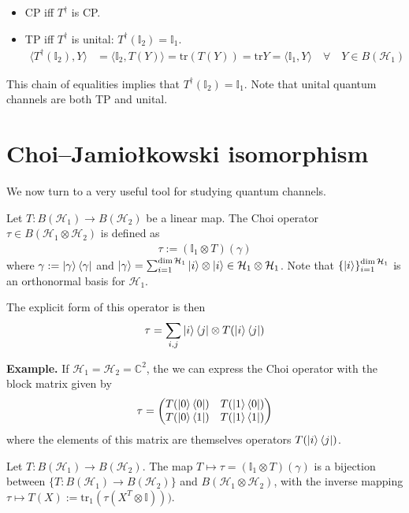 \documentclass[../../note.tex]{subfiles}
\begin{document}
\begin{itemize}
    \item CP iff $T^{\dagger}$ is CP.
    \item TP iff $T^{\dagger}$ is unital: $T^{\dagger}(\mathbb{I}_2)=\mathbb{I}_1$.
    \begin{align}
        \langle T^{\dagger}(\mathbb{I}_2),Y \rangle &= \langle \mathbb{I}_2,T(Y)\rangle = \text{tr}(T(Y))=\text{tr}Y = \langle \mathbb{I}_1, Y\rangle \quad \forall \quad Y \in B(\mathcal{H}_1)
    \end{align}
\end{itemize}
This chain of equalities implies that $T^{\dagger}(\mathbb{I}_2)=\mathbb{I}_1$. Note that unital quantum channels are both TP and unital.

\section{
Choi–Jamiołkowski isomorphism}
We now turn to a very useful tool for studying quantum channels. 
\begin{definition}
Let $T:B(\mathcal{H}_1)\rightarrow B(\mathcal{H}_2)$ be a linear map. The Choi operator $\tau \in B(\mathcal{H}_1 \otimes \mathcal{H}_2)$ is defined as 
\begin{align}
    \tau := (\mathbb{I}_1\otimes T)(\gamma) 
\end{align}
where $\gamma := \ket{\gamma}\bra{\gamma}$ and $\ket{\gamma}=\sum_{i=1}^{\dim\mathcal{H}_1} \ket{i}\otimes \ket{i} \in \mathcal{H}_1 \otimes \mathcal{H}_1 $. Note that $\{\ket{i}\}_{i=1}^{\dim\mathcal{H}_1}$ is an orthonormal basis for $\mathcal{H}_1$. 
\end{definition}
The explicit form of this operator is then
\begin{align}
    \tau = \sum_{i,j} \ket{i}\bra{j} \otimes T(\ket{i}\bra{j})
\end{align}

\begin{tcolorbox}[colframe=black,breakable, colback=brown!8, arc=0pt, outer arc=0pt,boxrule=0.5pt]
\textbf{Example.} If $\mathcal{H}_1 = \mathcal{H}_2=\mathbb{C}^2$, the we can express the Choi operator with the block matrix given by
\begin{align}
    \tau = \begin{pmatrix}
    T(\ket{0}\bra{0}) & T(\ket{1}\bra{0})\\
    T(\ket{0}\bra{1}) & T(\ket{1}\bra{1})
    \end{pmatrix}
\end{align}
where the elements of this matrix are themselves operators $T(\ket{i}\bra{j})$.
\end{tcolorbox}
\begin{proposition}
Let $T: B(\mathcal{H}_1)\rightarrow B(\mathcal{H}_2)$. The map $T \mapsto \tau = (\mathbb{I}_1 \otimes T)(\gamma)$ is a bijection between $\{T: B(\mathcal{H}_1)\rightarrow B(\mathcal{H}_2)\}$ and $B(\mathcal{H}_1 \otimes \mathcal{H}_2)$, with the inverse mapping $\tau \mapsto T(X):=\text{tr}_1(\tau(X^{T}\otimes \mathbb{I})))$.
\end{proposition}
\end{document}
